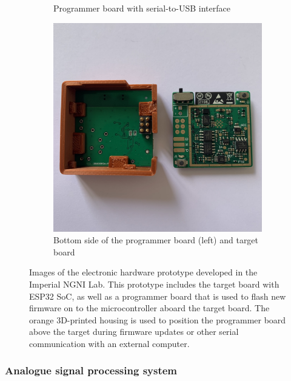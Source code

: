 \begin{figure}[!htb]
\begin{subfigure}[b]{0.3\textwidth}
         \caption{Programmer board with serial-to-USB interface }
         \label{fig:esp-hardware-programmer}
     \end{subfigure}
     \hfill
    \begin{subfigure}[b]{0.3\textwidth}
         \centering
         \includegraphics[width=\textwidth]{esp-both}
         \caption{Bottom side of the programmer board (left) and target board}
         \label{fig:esp-hardware-both}
     \end{subfigure}
        \caption[Images of the electronic hardware prototype developed in the Imperial NGNI Lab]{Images of the electronic hardware prototype developed in the Imperial NGNI Lab. This prototype includes the target board with ESP32 SoC, as well as a programmer board that is used to flash new firmware on to the microcontroller aboard the target board. The orange 3D-printed housing is used to position the programmer board above the target during firmware updates or other serial communication with an external computer.}
        \label{fig:esp-hardware}
\end{figure}

\subsubsection{Analogue signal processing system}

